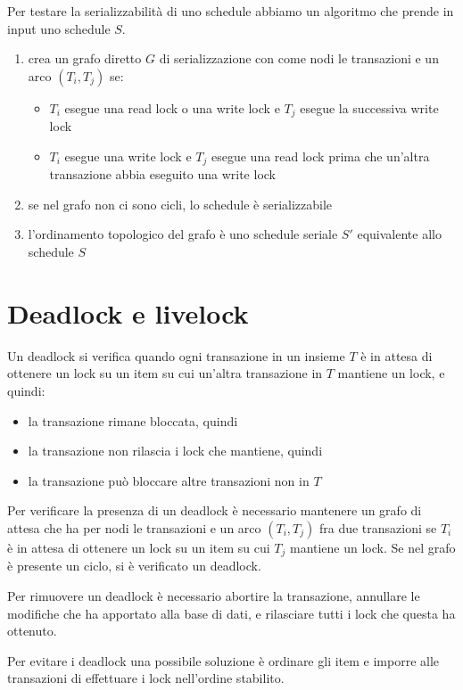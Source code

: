 Per testare la serializzabilit\`a di uno schedule abbiamo un algoritmo che prende in input uno schedule $S$.

\begin{enumerate}
    \item crea un grafo diretto $G$ di serializzazione con come nodi le transazioni e un arco $(T_i, T_j)$ se:
    \begin{itemize}
        \item $T_i$ esegue una read lock o una write lock e $T_j$ esegue la successiva write lock
        \item $T_i$ esegue una write lock e $T_j$ esegue una read lock prima che un'altra transazione abbia eseguito una write lock
    \end{itemize}
    \item se nel grafo non ci sono cicli, lo schedule \`e serializzabile
    \item l'ordinamento topologico del grafo \`e uno schedule seriale $S'$ equivalente allo schedule $S$
\end{enumerate}

\section{Deadlock e livelock}

Un deadlock si verifica quando ogni transazione in un insieme $T$ \`e in attesa di ottenere un lock su un item su cui un'altra transazione in $T$ mantiene un lock, e quindi:
\begin{itemize}
    \item la transazione rimane bloccata, quindi
    \item la transazione non rilascia i lock che mantiene, quindi
    \item la transazione pu\`o bloccare altre transazioni non in $T$
\end{itemize}

Per verificare la presenza di un deadlock \`e necessario mantenere un grafo di attesa che ha per nodi le transazioni e un arco $(T_i, T_j)$ fra due transazioni se $T_i$ \`e in attesa di ottenere un lock su un item su cui $T_j$ mantiene un lock. Se nel grafo \`e presente un ciclo, si \`e verificato un deadlock.

Per rimuovere un deadlock \`e necessario abortire la transazione, annullare le modifiche che ha apportato alla base di dati, e rilasciare tutti i lock che questa ha ottenuto.

Per evitare i deadlock una possibile soluzione \`e ordinare gli item e imporre alle transazioni di effettuare i lock nell'ordine stabilito.

